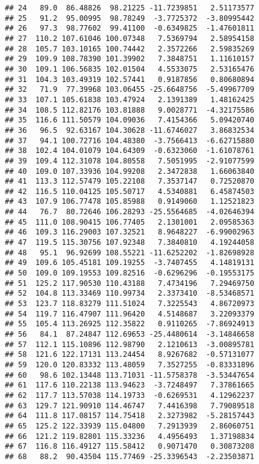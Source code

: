 \documentclass{article}\usepackage[]{graphicx}\usepackage[]{color}
\makeatletter
\newenvironment{kframe}{%
 \def\at@end@of@kframe{}%
 \ifinner\ifhmode%
  \def\at@end@of@kframe{\end{minipage}}%
  \begin{minipage}{\columnwidth}%
 \fi\fi%
 \def\FrameCommand##1{\hskip\@totalleftmargin \hskip-\fboxsep
 \colorbox{shadecolor}{##1}\hskip-\fboxsep
     \hskip-\linewidth \hskip-\@totalleftmargin \hskip\columnwidth}%
 \MakeFramed {\advance\hsize-\width
   \@totalleftmargin\z@ \linewidth\hsize
   \@setminipage}}%
 {\par\unskip\endMakeFramed%
 \at@end@of@kframe}
\newenvironment{knitrout}{}{} %
\makeatother
\begin{document}
\begin{knitrout}
\begin{kframe}
\begin{verbatim}
## 24   89.0  86.48826  98.21225 -11.7239851   2.51173577
## 25   91.2  95.00995  98.78249  -3.7725372  -3.80995442
## 26   97.3  98.77602  99.41100  -0.6349825  -1.47601811
## 27  110.2 107.61046 100.07348   7.5369794   2.58954158
## 28  105.7 103.10165 100.74442   2.3572266   2.59835269
## 29  109.9 108.78390 101.39902   7.3848751   1.11610157
## 30  109.1 106.56835 102.01504   4.5533075   2.53165476
## 31  104.3 103.49319 102.57441   0.9187856   0.80680894
## 32   71.9  77.39968 103.06455 -25.6648756  -5.49967709
## 33  107.1 105.61838 103.47924   2.1391389   1.48162425
## 34  108.5 112.82176 103.81888   9.0028771  -4.32175586
## 35  116.6 111.50579 104.09036   7.4154366   5.09420740
## 36   96.5  92.63167 104.30628 -11.6746027   3.86832534
## 37   94.1 100.72716 104.48380  -3.7566413  -6.62715880
## 38  102.4 104.01079 104.64309  -0.6323060  -1.61078761
## 39  109.4 112.31078 104.80558   7.5051995  -2.91077599
## 40  109.0 107.33936 104.99208   2.3472838   1.66063840
## 41  113.3 112.57479 105.22108   7.3537147   0.72520870
## 42  116.5 110.04125 105.50717   4.5340881   6.45874503
## 43  107.9 106.77478 105.85988   0.9149060   1.12521823
## 44   76.7  80.72646 106.28293 -25.5564685  -4.02646394
## 45  111.0 108.90415 106.77405   2.1301001   2.09585363
## 46  109.3 116.29003 107.32521   8.9648227  -6.99002963
## 47  119.5 115.30756 107.92348   7.3840810   4.19244058
## 48   95.1  96.92699 108.55221 -11.6252202  -1.82698928
## 49  109.6 105.45181 109.19255  -3.7407455   4.14819131
## 50  109.0 109.19553 109.82516  -0.6296296  -0.19553175
## 51  125.2 117.90530 110.43188   7.4734196   7.29469750
## 52  104.8 113.33469 110.99734   2.3373410  -8.53468571
## 53  123.7 118.83279 111.51024   7.3225543   4.86720973
## 54  119.7 116.47907 111.96420   4.5148687   3.22093379
## 55  105.4 113.26925 112.35822   0.9110265  -7.86924913
## 56   84.1  87.24847 112.69653 -25.4480614  -3.14846658
## 57  112.1 115.10896 112.98790   2.1210613  -3.00895781
## 58  121.6 122.17131 113.24454   8.9267682  -0.57131077
## 59  120.0 120.83332 113.48059   7.3527255  -0.83331896
## 60   98.6 102.13448 113.71031 -11.5758378  -3.53447654
## 61  117.6 110.22138 113.94623  -3.7248497   7.37861665
## 62  117.7 113.57038 114.19733  -0.6269531   4.12962237
## 63  129.7 121.90910 114.46747   7.4416398   7.79089518
## 64  111.8 117.08157 114.75418   2.3273982  -5.28157443
## 65  125.2 122.33939 115.04800   7.2913939   2.86060751
## 66  121.2 119.82801 115.33236   4.4956493   1.37198834
## 67  116.8 116.49127 115.58412   0.9071470   0.30873208
## 68   88.2  90.43504 115.77469 -25.3396543  -2.23503871

\end{verbatim}
\end{kframe}
\end{knitrout}
\end{document}
